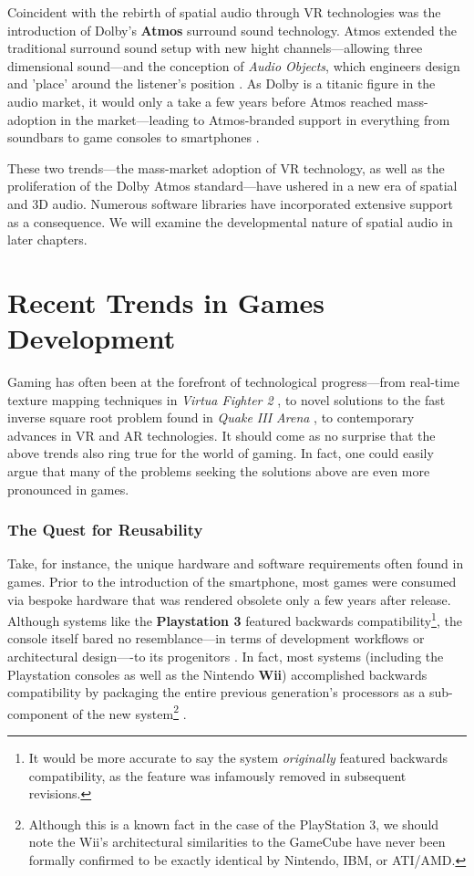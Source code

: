 \documentclass{report}
\newcommand{\tech}[1]{\textbf{#1}}
\begin{document}
Coincident with the rebirth of spatial audio through VR technologies was the introduction of Dolby's \tech{Atmos} surround sound technology. Atmos extended the traditional surround sound setup with new hight channels---allowing three dimensional sound---and the conception of \emph{Audio Objects}, which engineers design and 'place' around the listener's position \cite{Dolby_Laboratories_2016}. As Dolby is a titanic figure in the audio market, it would only a take a few years before Atmos reached mass-adoption in the market---leading to Atmos-branded support in everything from soundbars to game consoles to smartphones \cite{Cox_2020}. 

These two trends---the mass-market adoption of VR technology, as well as the proliferation of the Dolby Atmos standard---have ushered in a new era of spatial and 3D audio. Numerous software libraries have incorporated extensive support as a consequence. We will examine the developmental nature of spatial audio in later chapters.   


\section{Recent Trends in Games Development}

Gaming has often been at the forefront of technological progress---from real-time texture mapping techniques in \emph{Virtua Fighter 2} \cite{liboa2020hardware}, to novel solutions to the fast inverse square root problem found in \emph{Quake III Arena} \cite{lomont2003fast}, to contemporary advances in VR and AR technologies. It should come as no surprise that the above trends also ring true for the world of gaming. In fact, one could easily argue that many of the problems seeking the solutions above are even more pronounced in games. 

\subsubsection{The Quest for Reusability}
Take, for instance, the unique hardware and software requirements often found in games. Prior to the introduction of the smartphone, most games were consumed via bespoke hardware that was rendered obsolete only a few years after release. Although systems like the \tech{Playstation 3} featured backwards compatibility\footnote{It would be more accurate to say the system \emph{originally} featured backwards compatibility, as the feature was infamously removed in subsequent revisions.}, the console itself bared no resemblance---in terms of development workflows or architectural design----to its progenitors \cite{Kuchera_2009}. In fact, most systems (including the Playstation consoles as well as the Nintendo \tech{Wii}) accomplished backwards compatibility by packaging the entire previous generation's processors as a sub-component of the new system\footnote{Although this is a known fact in the case of the PlayStation 3, we should note the Wii's architectural similarities to the GameCube have never been formally confirmed to be exactly identical by Nintendo, IBM, or ATI/AMD.} \cite{Copetti_2021} \cite{Copetti_2020}. 
\end{document}
